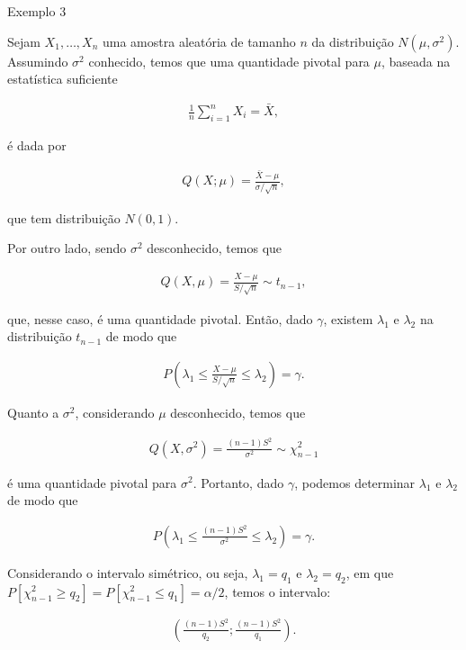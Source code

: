 \documentclass[12pt]{beamer}
\begin{document}
\begin{frame}{Exemplo 3}
\begin{block}{}
\justifying
Sejam $X_1, \ldots, X_n$ uma amostra aleatória de tamanho $n$ da distribuição $N(\mu, \sigma^2)$. Assumindo $\sigma^2$ conhecido, temos que uma quantidade pivotal para $\mu$, baseada na estatística suficiente

\begin{align*}
\frac{1}{n} \sum_{i=1}^{n} X_i = \bar{X},
\end{align*}

é dada por

\begin{align*}
Q(X; \mu) = \frac{\bar{X} - \mu}{\sigma/\sqrt{n}},
\end{align*}

que tem distribuição $N(0, 1)$.
\end{block}
\end{frame}

\begin{frame}{}
\begin{block}{}
\justifying
Por outro lado, sendo $\sigma^2$ desconhecido, temos que

\begin{align*}
Q(X, \mu) = \frac{X - \mu}{S/\sqrt{n}} \sim t_{n-1},
\end{align*}

que, nesse caso, é uma quantidade pivotal. Então, dado $\gamma$, existem $\lambda_1$ e $\lambda_2$ na distribuição $t_{n-1}$ de modo que

\begin{align*}
P\left(\lambda_1 \leq \frac{X - \mu}{S/\sqrt{n}} \leq \lambda_2\right) = \gamma.
\end{align*}
\end{block}
\end{frame}

\begin{frame}{}
\begin{block}{}
\justifying
Quanto a $\sigma^2$, considerando $\mu$ desconhecido, temos que

\begin{align*}
Q(X, \sigma^2) = \frac{(n - 1)S^2}{\sigma^2} \sim \chi^2_{n-1}
\end{align*}

é uma quantidade pivotal para $\sigma^2$. Portanto, dado $\gamma$, podemos determinar $\lambda_1$ e $\lambda_2$ de modo que

\begin{align*}
P\left(\lambda_1 \leq \frac{(n - 1)S^2}{\sigma^2} \leq \lambda_2\right) = \gamma.
\end{align*}

Considerando o intervalo simétrico, ou seja, $\lambda_1 = q_1$ e $\lambda_2 = q_2$, em que $P[\chi^2_{n-1} \geq q_2] = P[\chi^2_{n-1} \leq q_1] = \alpha/2$, temos o intervalo:

\begin{align*}
\left(\frac{(n - 1)S^2}{q_2}; \frac{(n - 1)S^2}{q_1}\right).
\end{align*}
\end{block}
\end{frame}
\end{document}
